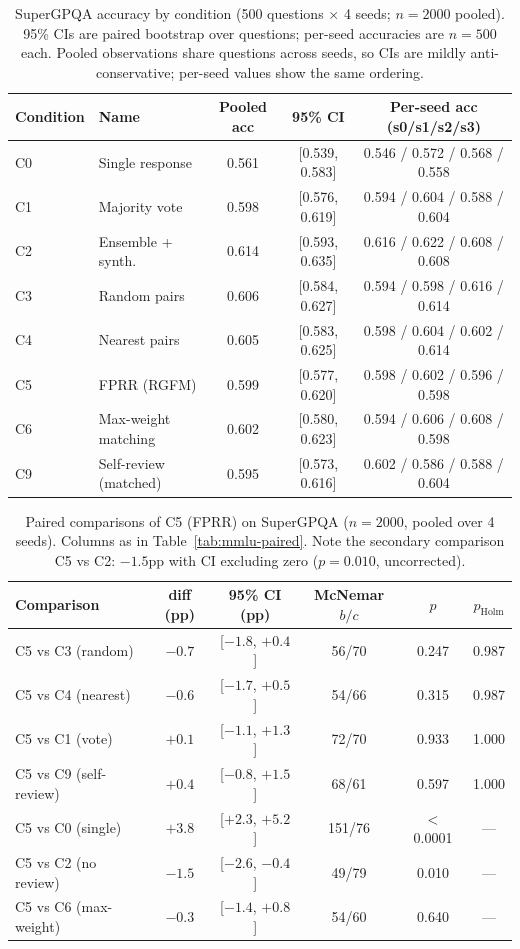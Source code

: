 \documentclass[11pt]{article}
\begin{document}
\begin{table}[t]
\centering
\small
\caption{SuperGPQA accuracy by condition (500 questions $\times$ 4 seeds; $n=2000$ pooled). 95\% CIs are paired bootstrap over questions; per-seed accuracies are $n=500$ each. Pooled observations share questions across seeds, so CIs are mildly anti-conservative; per-seed values show the same ordering.}
\label{tab:sg-acc}
\begin{tabular}{llccc}
\toprule
Condition & Name & Pooled acc & 95\% CI & Per-seed acc (s0/s1/s2/s3) \\
\midrule
C0 & Single response      & 0.561 & [0.539, 0.583] & 0.546 / 0.572 / 0.568 / 0.558 \\
C1 & Majority vote        & 0.598 & [0.576, 0.619] & 0.594 / 0.604 / 0.588 / 0.604 \\
C2 & Ensemble + synth.    & 0.614 & [0.593, 0.635] & 0.616 / 0.622 / 0.608 / 0.608 \\
C3 & Random pairs         & 0.606 & [0.584, 0.627] & 0.594 / 0.598 / 0.616 / 0.614 \\
C4 & Nearest pairs        & 0.605 & [0.583, 0.625] & 0.598 / 0.604 / 0.602 / 0.614 \\
C5 & FPRR (RGFM)          & 0.599 & [0.577, 0.620] & 0.598 / 0.602 / 0.596 / 0.598 \\
C6 & Max-weight matching  & 0.602 & [0.580, 0.623] & 0.594 / 0.606 / 0.608 / 0.598 \\
C9 & Self-review (matched)& 0.595 & [0.573, 0.616] & 0.602 / 0.586 / 0.588 / 0.604 \\
\bottomrule
\end{tabular}
\end{table}

\begin{table}[t]
\centering
\small
\caption{Paired comparisons of C5 (FPRR) on SuperGPQA ($n=2000$, pooled over 4 seeds). Columns as in Table~\ref{tab:mmlu-paired}. Note the secondary comparison C5 vs C2: $-1.5$pp with CI excluding zero ($p=0.010$, uncorrected).}
\label{tab:sg-paired}
\begin{tabular}{lccccc}
\toprule
Comparison & diff (pp) & 95\% CI (pp) & McNemar $b/c$ & $p$ & $p_{\mathrm{Holm}}$ \\
\midrule
C5 vs C3 (random)      & $-0.7$ & [$-1.8$, $+0.4$] & 56/70 & 0.247 & 0.987 \\
C5 vs C4 (nearest)     & $-0.6$ & [$-1.7$, $+0.5$] & 54/66 & 0.315 & 0.987 \\
C5 vs C1 (vote)        & $+0.1$ & [$-1.1$, $+1.3$] & 72/70 & 0.933 & 1.000 \\
C5 vs C9 (self-review) & $+0.4$ & [$-0.8$, $+1.5$] & 68/61 & 0.597 & 1.000 \\
\midrule
C5 vs C0 (single)      & $+3.8$ & [$+2.3$, $+5.2$] & 151/76 & $<$0.0001 & --- \\
C5 vs C2 (no review)   & $-1.5$ & [$-2.6$, $-0.4$] & 49/79 & 0.010 & --- \\
C5 vs C6 (max-weight)  & $-0.3$ & [$-1.4$, $+0.8$] & 54/60 & 0.640 & --- \\
\bottomrule
\end{tabular}
\end{table}
\end{document}
